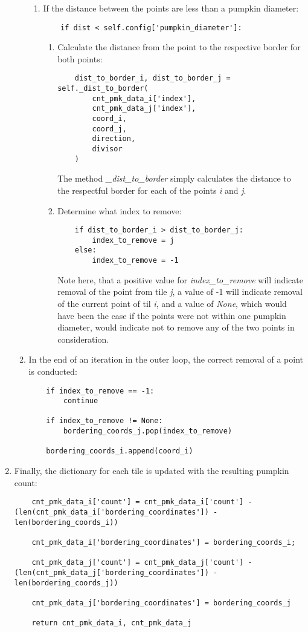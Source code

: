 \documentclass[../Head/Main.tex]{subfiles}
\begin{document}
\begin{enumerate}
\begin{enumerate}
\begin{enumerate}
\item If the distance between the points are less than a pumpkin diameter:
\begin{verbatim}
    if dist < self.config['pumpkin_diameter']:
\end{verbatim}
\begin{enumerate}
\item Calculate the distance from the point to the respective border for both points:
\begin{verbatim}
    dist_to_border_i, dist_to_border_j = self._dist_to_border(
        cnt_pmk_data_i['index'],
        cnt_pmk_data_j['index'],
        coord_i,
        coord_j,
        direction,
        divisor
    )
\end{verbatim}
The method \textit{\_dist\_to\_border} simply calculates the distance to the respectful border for each of the points \textit{i} and \textit{j}.
\item Determine what index to remove:
\begin{verbatim}
    if dist_to_border_i > dist_to_border_j:
        index_to_remove = j
    else:
        index_to_remove = -1
\end{verbatim}
Note here, that a positive value for \textit{index\_to\_remove} will indicate removal of the point from tile \textit{j}, a value of -1 will indicate removal of the current point of til \textit{i}, and a value of \textit{None}, which would have been the case if the points were not within one pumpkin diameter, would indicate not to remove any of the two points in consideration.
\end{enumerate}
\end{enumerate}
\item In the end of an iteration in the outer loop, the correct removal of a point is conducted:
\begin{verbatim}
    if index_to_remove == -1:
        continue

    if index_to_remove != None:
        bordering_coords_j.pop(index_to_remove)

    bordering_coords_i.append(coord_i)
\end{verbatim}
\end{enumerate}
\item Finally, the dictionary for each tile is updated with the resulting pumpkin count:
\begin{verbatim}
    cnt_pmk_data_i['count'] = cnt_pmk_data_i['count'] - (len(cnt_pmk_data_i['bordering_coordinates']) - len(bordering_coords_i))

    cnt_pmk_data_i['bordering_coordinates'] = bordering_coords_i;

    cnt_pmk_data_j['count'] = cnt_pmk_data_j['count'] - (len(cnt_pmk_data_j['bordering_coordinates']) - len(bordering_coords_j))

    cnt_pmk_data_j['bordering_coordinates'] = bordering_coords_j

    return cnt_pmk_data_i, cnt_pmk_data_j
\end{verbatim}
\end{enumerate}
\end{document}
